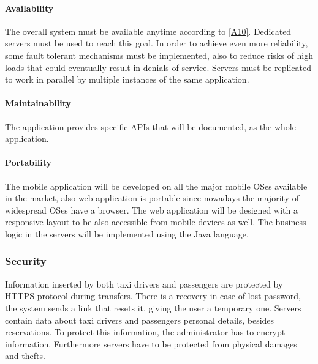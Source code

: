 \documentclass[a4paper,12pt]{article}%
\begin{document}
\paragraph{Availability} The overall system must be available anytime according to \hyperref[a10]{[A10]}. Dedicated servers must be used to reach this goal. In order to achieve even more reliability, some fault tolerant mechanisms must be implemented, also to reduce risks of high loads that could eventually result in denials of service. Servers must be replicated to work in parallel by multiple instances of the same application. 
\paragraph{Maintainability} The application provides specific APIs that will be documented, as the whole application.
\paragraph{Portability} The mobile application will be developed on all the major mobile OSes available in the market, also web application is portable since nowadays the majority of widespread OSes have a browser. The web application will be designed with a responsive layout to be also accessible from mobile devices as well. The business logic in the servers will be implemented using the Java language.
\subsubsection{Security}
Information inserted by both taxi drivers and passengers are protected by HTTPS protocol during transfers. There is a recovery in case of lost password, the system sends a link that resets it, giving the user a temporary one.
\newline
Servers contain data about taxi drivers and passengers personal details, besides reservations. To protect this information, the administrator has to encrypt information. Furthermore servers have to be protected from physical damages and thefts.
\end{document}
